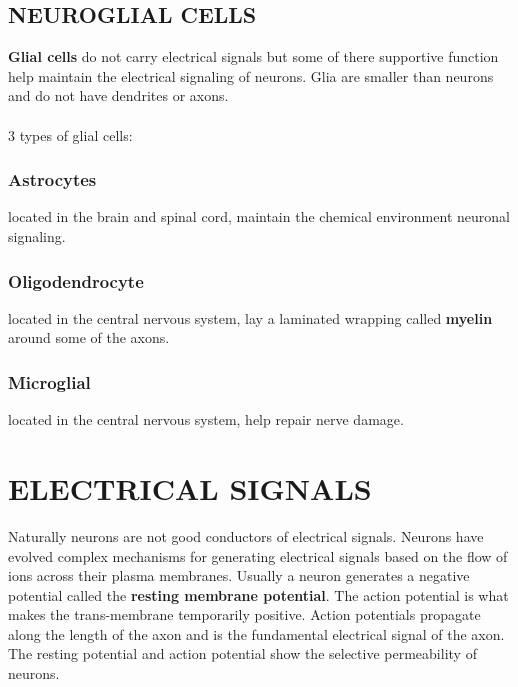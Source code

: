 \documentclass[english]{def}
\begin{document}
\subsection{NEUROGLIAL CELLS}


\textbf{Glial cells} do not carry electrical signals but some of there supportive function help maintain the electrical signaling of neurons.
Glia are smaller than neurons and do not have dendrites or axons.\\\\
3 types of glial cells:

\subsubsection{\textbf{Astrocytes}} located in the brain and spinal cord, maintain the chemical environment neuronal signaling.
\subsubsection{\textbf{Oligodendrocyte}} located in the central nervous system, lay a laminated wrapping called \textbf{myelin} around some of the axons.
\subsubsection{\textbf{Microglial}}  located in the central nervous system, help repair nerve damage.

\section{ELECTRICAL SIGNALS}

Naturally neurons are not good conductors of electrical signals. Neurons have evolved complex mechanisms for generating electrical signals based on the flow of ions across their plasma membranes. Usually a neuron generates a negative potential called the \textbf{resting membrane potential}. The action potential is what makes the trans-membrane temporarily positive. Action potentials propagate along the length of the axon and is the fundamental  electrical signal of the axon. The resting potential and action potential show the selective permeability of neurons.
\end{document}
